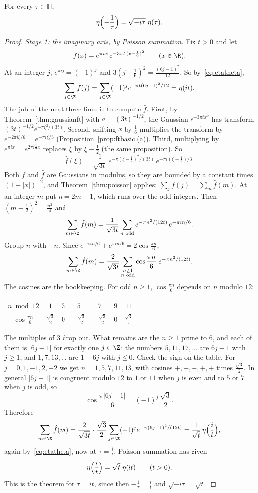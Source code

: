 \begin{theorem}\label{thm:eta}
For every $\tau\in\mathbb H$,
\[
\eta\Bigl(-\frac1\tau\Bigr)=\sqrt{-i\tau}\;\eta(\tau).
\]
\end{theorem}
\begin{proof}
\emph{Stage 1: the imaginary axis, by Poisson summation.} Fix $t>0$ and let
\[
f(x)=e^{\pi ix}\,e^{-3\pi t\,(x-\frac16)^2}\qquad(x\in\R).
\]
At an integer $j$, $e^{\pi ij}=(-1)^j$ and $3(j-\frac16)^2=\frac{(6j-1)^2}{12}$. So by~\eqref{eq:etatheta},
\[
\sum_{j\in\Z}f(j)=\sum_{j\in\Z}(-1)^je^{-\pi t(6j-1)^2/12}=\eta(it).
\]
The job of the next three lines is to compute $\hat f$. First, by Theorem~\ref{thm:gaussianft} with $a=(3t)^{-1/2}$, the Gaussian $e^{-3\pi tx^2}$ has transform $(3t)^{-1/2}e^{-\pi\xi^2/(3t)}$. Second, shifting $x$ by $\frac16$ multiplies the transform by $e^{-2\pi i\xi/6}=e^{-\pi i\xi/3}$ (Proposition~\ref{prop:ftbasic}(a)). Third, multiplying by $e^{\pi ix}=e^{2\pi i\frac12x}$ replaces $\xi$ by $\xi-\frac12$ (the same proposition). So
\[
\hat f(\xi)=\frac1{\sqrt{3t}}\,e^{-\pi(\xi-\frac12)^2/(3t)}\,e^{-\pi i(\xi-\frac12)/3}.
\]
Both $f$ and $\hat f$ are Gaussians in modulus, so they are bounded by a constant times $(1+|x|)^{-2}$, and Theorem~\ref{thm:poisson} applies: $\sum_jf(j)=\sum_m\hat f(m)$. At an integer $m$ put $n=2m-1$, which runs over the odd integers. Then $(m-\frac12)^2=\frac{n^2}4$ and
\[
\sum_{m\in\Z}\hat f(m)=\frac1{\sqrt{3t}}\sum_{n\text{ odd}}e^{-\pi n^2/(12t)}\,e^{-\pi in/6}.
\]
Group $n$ with $-n$. Since $e^{-\pi in/6}+e^{\pi in/6}=2\cos\frac{\pi n}6$,
\[
\sum_{m\in\Z}\hat f(m)=\frac2{\sqrt{3t}}\sum_{\substack{n\ge1\\n\text{ odd}}}\cos\frac{\pi n}6\;e^{-\pi n^2/(12t)}.
\]
The cosines are the bookkeeping. For odd $n\ge1$, $\cos\frac{\pi n}6$ depends on $n$ modulo $12$:
\begin{center}
\begin{tabular}{c|cccccc}
$n\bmod12$ & $1$ & $3$ & $5$ & $7$ & $9$ & $11$\\\hline
$\cos\frac{\pi n}6$ & $\frac{\sqrt3}2$ & $0$ & $-\frac{\sqrt3}2$ & $-\frac{\sqrt3}2$ & $0$ & $\frac{\sqrt3}2$
\end{tabular}
\end{center}
The multiples of $3$ drop out. What remains are the $n\ge1$ prime to $6$, and each of them is $|6j-1|$ for exactly one $j\in\Z$: the numbers $5,11,17,\dots$ are $6j-1$ with $j\ge1$, and $1,7,13,\dots$ are $1-6j$ with $j\le0$. Check the sign on the table. For $j=0,1,-1,2,-2$ we get $n=1,5,7,11,13$, with cosines $+,-,-,+,+$ times $\frac{\sqrt3}2$. In general $|6j-1|$ is congruent modulo $12$ to $1$ or $11$ when $j$ is even and to $5$ or $7$ when $j$ is odd, so
\[
\cos\frac{\pi|6j-1|}6=(-1)^j\,\frac{\sqrt3}2.
\]
Therefore
\[
\sum_{m\in\Z}\hat f(m)=\frac2{\sqrt{3t}}\cdot\frac{\sqrt3}2\sum_{j\in\Z}(-1)^je^{-\pi(6j-1)^2/(12t)}=\frac1{\sqrt t}\,\eta\Bigl(\frac it\Bigr),
\]
again by~\eqref{eq:etatheta}, now at $\tau=\frac it$. Poisson summation has given
\[
\eta\Bigl(\frac it\Bigr)=\sqrt t\;\eta(it)\qquad(t>0).
\]
This is the theorem for $\tau=it$, since then $-\frac1\tau=\frac it$ and $\sqrt{-i\tau}=\sqrt t$.


\end{proof}
